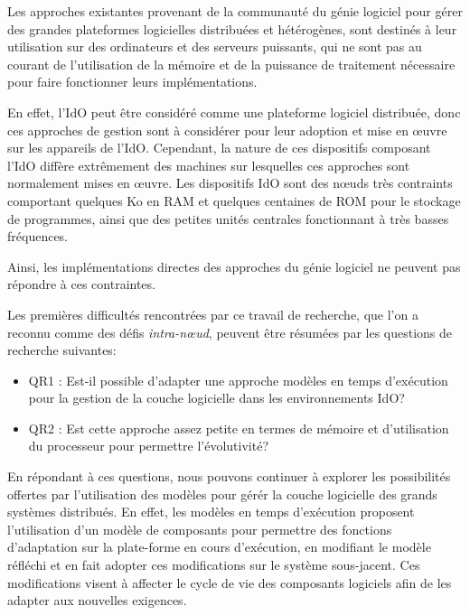 Les approches existantes provenant de la communaut\'e du g\'enie logiciel pour g\'erer des grandes plateformes logicielles distribu\'ees et h\'et\'erog\`enes, sont destin\'es \`a leur utilisation sur des ordinateurs et des serveurs puissants, qui ne sont pas au courant de l'utilisation de la m\'emoire et de la puissance de traitement n\'ecessaire pour faire fonctionner leurs impl\'ementations.

En effet, l'IdO peut \^etre consid\'er\'e comme une plateforme logiciel distribu\'ee, donc ces approches de gestion sont \`a consid\'erer pour leur adoption et mise en \oe{}uvre sur les appareils de l'IdO.
Cependant, la nature de ces dispositifs composant l'IdO diff\`ere extr\^emement des machines sur lesquelles ces approches sont normalement mises en \oe{}uvre.
Les dispositifs IdO sont des n\oe{}uds tr\`es contraints comportant quelques Ko en RAM et quelques centaines de ROM pour le stockage de programmes, ainsi que des petites unit\'es centrales fonctionnant \`a tr\`es basses fr\'equences.

Ainsi, les impl\'ementations directes des approches du g\'enie logiciel ne peuvent pas r\'epondre \`a ces contraintes.

Les premi\`eres difficult\'es rencontr\'ees par ce travail de recherche, que l'on a reconnu comme des d\'efis \textit{intra-n\oe{}ud}, peuvent \^etre r\'esum\'ees par les questions de recherche suivantes:

\begin{itemize}
	\item QR1 : Est-il possible d'adapter une approche mod\`eles en temps d'ex\'ecution pour la gestion de la couche logicielle dans les environnements IdO? 
	\item QR2 : Est cette approche assez petite en termes de mémoire et d'utilisation du processeur pour permettre l'\'evolutivit\'e?
\end{itemize}

En r\'epondant \`a ces questions, nous pouvons continuer \`a explorer les possibilit\'es offertes par l'utilisation des mod\`eles pour g\'er\'er la couche logicielle des grands syst\`emes distribu\'es.
En effet, les mod\`eles en temps d'ex\'ecution proposent l'utilisation d'un mod\`ele de composants pour permettre des fonctions d'adaptation sur la plate-forme en cours d'ex\'ecution, en modifiant le mod\`ele r\'efl\'echi et en fait adopter ces modifications sur le système sous-jacent.
Ces modifications visent \`a affecter le cycle de vie des composants logiciels afin de les adapter aux nouvelles exigences.

